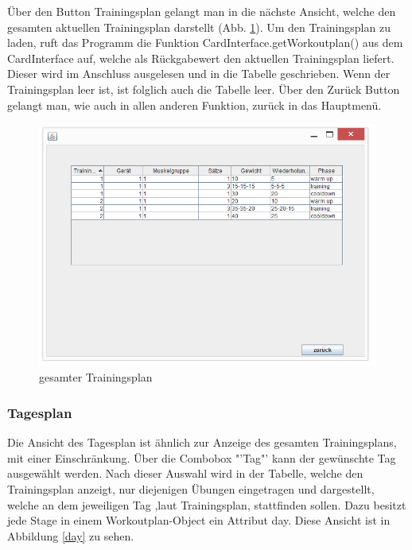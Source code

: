Über den Button Trainingsplan gelangt man in die nächste Ansicht, welche den gesamten aktuellen Trainingsplan darstellt (Abb. \ref{main}). Um den Trainingsplan zu laden, ruft das Programm die Funktion CardInterface.getWorkoutplan() aus dem CardInterface auf, welche als Rückgabewert den aktuellen Trainingsplan liefert. Dieser wird im Anschluss ausgelesen und in die Tabelle geschrieben. Wenn der Trainingsplan leer ist, ist folglich auch die Tabelle leer. Über den Zurück Button gelangt man, wie auch in allen anderen Funktion, zurück in das Hauptmenü.

\begin{figure}[h]
\includegraphics[width=1\hsize]{./images/gesamt.png}
\caption{gesamter Trainingsplan}
\label{main}
\end{figure}

\subsubsection*{Tagesplan}

Die Ansicht des Tagesplan ist ähnlich zur Anzeige des gesamten Trainingsplans, mit einer Einschränkung. Über die Combobox "'Tag"' kann der gewünschte Tag ausgewählt werden. Nach dieser Auswahl wird in der Tabelle, welche den Trainingsplan anzeigt, nur diejenigen Übungen eingetragen und dargestellt, welche an dem jeweiligen Tag ,laut Trainingsplan, stattfinden sollen. Dazu besitzt jede Stage in einem Workoutplan-Object ein Attribut day. Diese Ansicht ist in Abbildung \ref{day} zu sehen.

